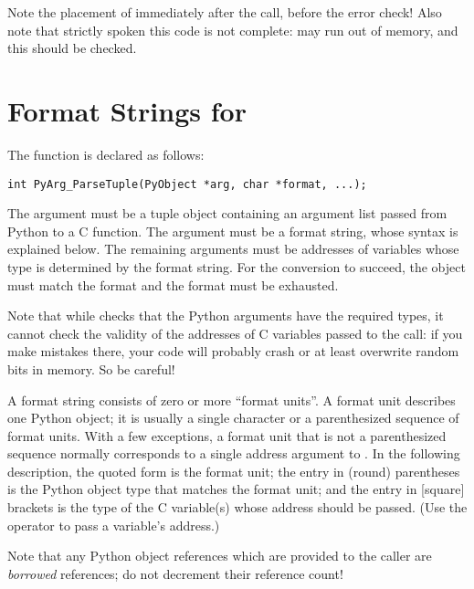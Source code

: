 \documentclass{manual}
\begin{document}
Note the placement of  immediately after the
call, before the error check!  Also note that strictly spoken this
code is not complete:  may run out of
memory, and this should be checked.


\section{Format Strings for 
         \label{parseTuple}}

The  function is declared as follows:

\begin{verbatim}
int PyArg_ParseTuple(PyObject *arg, char *format, ...);
\end{verbatim}

The  argument must be a tuple object containing an argument
list passed from Python to a C function.  The  argument
must be a format string, whose syntax is explained below.  The
remaining arguments must be addresses of variables whose type is
determined by the format string.  For the conversion to succeed, the
 object must match the format and the format must be
exhausted.

Note that while  checks that the Python
arguments have the required types, it cannot check the validity of the
addresses of C variables passed to the call: if you make mistakes
there, your code will probably crash or at least overwrite random bits
in memory.  So be careful!

A format string consists of zero or more ``format units''.  A format
unit describes one Python object; it is usually a single character or
a parenthesized sequence of format units.  With a few exceptions, a
format unit that is not a parenthesized sequence normally corresponds
to a single address argument to .  In the
following description, the quoted form is the format unit; the entry
in (round) parentheses is the Python object type that matches the
format unit; and the entry in [square] brackets is the type of the C
variable(s) whose address should be passed.  (Use the \samp{\&}
operator to pass a variable's address.)

Note that any Python object references which are provided to the
caller are \emph{borrowed} references; do not decrement their
reference count!
\end{document}
